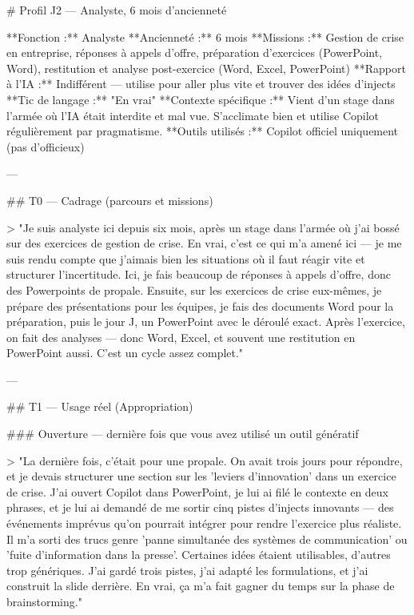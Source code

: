 # Profil J2 — Analyste, 6 mois d'ancienneté

**Fonction :** Analyste  
**Ancienneté :** 6 mois  
**Missions :** Gestion de crise en entreprise, réponses à appels d'offre, préparation d'exercices (PowerPoint, Word), restitution et analyse post-exercice (Word, Excel, PowerPoint)  
**Rapport à l'IA :** Indifférent — utilise pour aller plus vite et trouver des idées d'injects  
**Tic de langage :** "En vrai"  
**Contexte spécifique :** Vient d'un stage dans l'armée où l'IA était interdite et mal vue. S'acclimate bien et utilise Copilot régulièrement par pragmatisme.  
**Outils utilisés :** Copilot officiel uniquement (pas d'officieux)

---

## T0 — Cadrage (parcours et missions)

> "Je suis analyste ici depuis six mois, après un stage dans l'armée où j'ai bossé sur des exercices de gestion de crise. En vrai, c'est ce qui m'a amené ici — je me suis rendu compte que j'aimais bien les situations où il faut réagir vite et structurer l'incertitude. Ici, je fais beaucoup de réponses à appels d'offre, donc des Powerpoints de propale. Ensuite, sur les exercices de crise eux-mêmes, je prépare des présentations pour les équipes, je fais des documents Word pour la préparation, puis le jour J, un PowerPoint avec le déroulé exact. Après l'exercice, on fait des analyses — donc Word, Excel, et souvent une restitution en PowerPoint aussi. C'est un cycle assez complet."

---

## T1 — Usage réel (Appropriation)

### Ouverture — dernière fois que vous avez utilisé un outil génératif

> "La dernière fois, c'était pour une propale. On avait trois jours pour répondre, et je devais structurer une section sur les 'leviers d'innovation' dans un exercice de crise. J'ai ouvert Copilot dans PowerPoint, je lui ai filé le contexte en deux phrases, et je lui ai demandé de me sortir cinq pistes d'injects innovants — des événements imprévus qu'on pourrait intégrer pour rendre l'exercice plus réaliste. Il m'a sorti des trucs genre 'panne simultanée des systèmes de communication' ou 'fuite d'information dans la presse'. Certaines idées étaient utilisables, d'autres trop génériques. J'ai gardé trois pistes, j'ai adapté les formulations, et j'ai construit la slide derrière. En vrai, ça m'a fait gagner du temps sur la phase de brainstorming."

